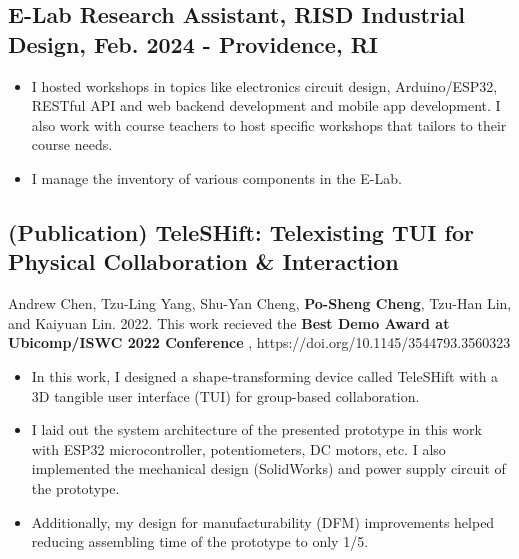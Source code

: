 \documentclass[12pt]{article}
\begin{document}
    \subsection*{E-Lab Research Assistant, RISD Industrial Design, Feb. 2024 -  \hfill Providence, RI}
        {\sffamily \small
        \begin{itemize}
            \item I hosted workshops in topics like electronics circuit design, Arduino/ESP32, RESTful API and web backend development and mobile app development.
            I also work with course teachers to host specific workshops that tailors to their course needs.
            \item I manage the inventory of various components in the E-Lab.
        \end{itemize}
        }
    \subsection*{(Publication) TeleSHift: Telexisting TUI for Physical Collaboration \& Interaction}
    {\sffamily \small
    {\scriptsize Andrew Chen, Tzu-Ling Yang, Shu-Yan Cheng, \textbf{Po-Sheng Cheng}, Tzu-Han Lin, and Kaiyuan Lin. 2022. This work recieved the \textbf{Best Demo Award at Ubicomp/ISWC 2022 Conference}%
    , https://doi.org/10.1145/3544793.3560323}
        \begin{itemize}
            \item In this work, I designed a shape-transforming device called TeleSHift with a 3D tangible user interface (TUI) for group-based collaboration.
            \item I laid out the system architecture of the presented prototype in this work with ESP32 microcontroller, potentiometers, DC motors, etc. I also implemented the mechanical design (SolidWorks) and power supply circuit of the prototype.
            \item Additionally, my design for manufacturability (DFM) improvements helped reducing assembling time of the prototype to only 1/5.
        \end{itemize}
        }
    
\end{document}
